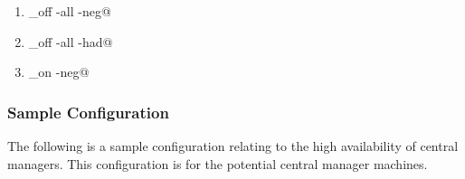 \begin{enumerate}
\item \verb@condor_off -all -neg@
\item \verb@condor_off -all -had@
\item \verb@condor_on -neg@
\end{enumerate}

\subsubsection{\label{sec:HA-sample-config} Sample Configuration} 
The following is a sample configuration relating to the 
high availability of central managers.
This configuration is for the potential central manager machines.

